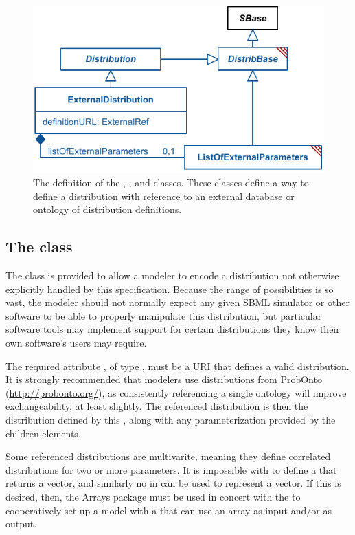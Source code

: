\begin{figure}[htb]
\includegraphics[width=0.5\linewidth]{figs/externalDistribution.pdf}
\caption{The definition of the \ExternalDistribution, \ExternalParameter, and \ListOfExternalParameters classes.  These classes define a way to define a distribution with reference to an external database or ontology of distribution definitions.}
\label{fig:externalDistribution}
\end{figure}

\subsection{The  class}
\label{ExternalDistribution-class}
\label{externaldistribution-class}

The \ExternalDistribution class is provided to allow a modeler to encode a distribution not otherwise explicitly handled by this specification.  Because the range of possibilities is so vast, the modeler should not normally expect any given SBML simulator or other software to be able to properly manipulate this distribution, but particular software tools may implement support for certain distributions they know their own software's users may require.

The required attribute , of type , must be a URI that defines a valid distribution.  It is strongly recommended that modelers use distributions from ProbOnto (\url{http://probonto.org/}), as consistently referencing a single ontology will improve exchangeability, at least slightly.  The referenced distribution is then the distribution defined by this \ExternalDistribution, along with any parameterization provided by the children \ExternalParameter elements.

Some referenced distributions are multivarite, meaning they define correlated distributions for two or more parameters.  It is impossible with \sbmlthreecore to define a \FunctionDefinition that returns a vector, and similarly no  in \sbmlthreecore can be used to represent a vector.  If this is desired, then, the Arrays package must be used in concert with the \ExternalDistribution to cooperatively set up a model with a \FunctionDefinition that can use an array as input and/or as output.

